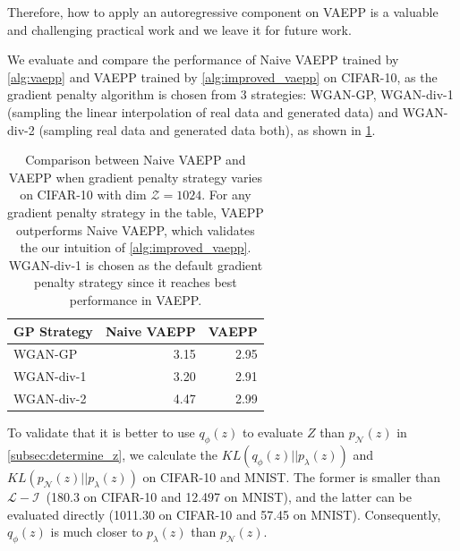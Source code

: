 Therefore, how to apply an autoregressive component on VAEPP is a valuable and challenging practical work and we leave it for future work.

We evaluate and compare the performance of Naive VAEPP trained by \cref{alg:vaepp} and VAEPP trained by \cref{alg:improved_vaepp} on CIFAR-10, as the gradient penalty algorithm is chosen from 3 strategies: WGAN-GP, WGAN-div-1 (sampling the linear interpolation of  real data and generated data) and WGAN-div-2 (sampling real data and generated data both), as shown in \cref{tab:compare_nD_over_R}. 
\begin{table}[tb]
\centering
\begin{tabular}{lrr}  
\toprule
GP Strategy  &  Naive VAEPP  & VAEPP \\
\midrule
WGAN-GP      &  3.15   & 2.95      \\
WGAN-div-1   &  3.20   & 2.91      \\
WGAN-div-2   &  4.47   & 2.99      \\
\bottomrule
\end{tabular}
\caption{Comparison between Naive VAEPP and VAEPP when gradient penalty strategy varies on CIFAR-10 with dim $\mathcal{Z} = 1024$. For any gradient penalty strategy in the table, VAEPP outperforms Naive VAEPP, which validates the our intuition of \cref{alg:improved_vaepp}.  WGAN-div-1 is chosen as the default gradient penalty strategy since it reaches best performance in VAEPP. 
}
\label{tab:compare_nD_over_R}
\end{table}

To validate that it is better to use $q_\phi(z)$ to evaluate $Z$ than $p_\mathcal{N}(z)$ in \cref{subsec:determine_z}, we calculate the $KL(q_\phi(z)||p_\lambda(z))$ and $KL(p_\mathcal{N}(z)||p_\lambda(z))$ on CIFAR-10 and MNIST. The former is smaller than $\mathcal{L}-\mathcal{I}$~\cite{hoffman2016elbo}(180.3 on CIFAR-10 and 12.497 on MNIST), and the latter can be evaluated directly (1011.30 on CIFAR-10 and 57.45 on MNIST). Consequently, $q_\phi(z)$ is much closer to $p_\lambda(z)$ than $p_\mathcal{N}(z)$. 

